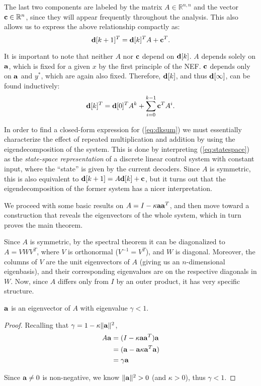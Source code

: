 The last two components are labeled by the matrix $A \in \mathbb{R}^{n,n}$ and the vector $\mathbf{c} \in \mathbb{R}^{n}$, since they will appear frequently throughout the analysis. This also allows us to express the above relationship compactly as:
\begin{equation}
\label{eq:statespace}
\mathbf{d}[k+1]^T = \mathbf{d}[k]^T A + \mathbf{c}^T.
\end{equation}

It is important to note that neither $A$ nor $\mathbf{c}$ depend on $\mathbf{d}[k]$. $A$ depends solely on $\mathbf{a}$, which is fixed for a given $x$ by the first principle of the NEF. $\mathbf{c}$ depends only on $\mathbf{a}$ and $y^*$, which are again also fixed. Therefore, $\mathbf{d}[k]$, and thus $\mathbf{d}[\infty]$, can be found inductively:
\begin{equation}
\label{eq:dksum}
\mathbf{d}[k]^T = \mathbf{d}[0]^T A^k + \sum_{i=0}^{k-1} \mathbf{c}^T A^i.
\end{equation}

In order to find a closed-form expression for (\ref{eq:dksum}) we must essentially characterize the effect of repeated multiplication and addition by using the eigendecomposition of the system. This is done by interpreting (\ref{eq:statespace}) as the {\it state-space representation} of a discrete linear control system with constant input, where the ``state'' is given by the current decoders. Since $A$ is symmetric, this is also equivalent to $\mathbf{d}[k+1] = A \mathbf{d}[k] + \mathbf{c}$, but it turns out that the eigendecomposition of the former system has a nicer interpretation.

We proceed with some basic results on $A = I - \kappa \mathbf{a}\mathbf{a}^T$, and then move toward a construction that reveals the eigenvectors of the whole system, which in turn proves the main theorem.

Since $A$ is symmetric, by the spectral theorem it can be diagonalized to $A = VWV^T$, where $V$ is orthonormal ($V^{-1} = V^T$), and $W$ is diagonal. Moreover, the columns of $V$ are the unit eigenvectors of $A$ (giving us an $n$-dimensional eigenbasis), and their corresponding eigenvalues are on the respective diagonals in $W$. Now, since $A$ differs only from $I$ by an outer product, it has very specific structure.

\begin{lemma}\label{lemma:1} $\mathbf{a}$ is an eigenvector of $A$ with eigenvalue $\gamma < 1$.\end{lemma}

\begin{proof} Recalling that $\gamma = 1 - \kappa \|\mathbf{a}\|^2$,
\begin{align*}
A\mathbf{a} &= (I - \kappa \mathbf{a}\mathbf{a}^T)\mathbf{a} \\
   &= (\mathbf{a} - \mathbf{a} \kappa \mathbf{a}^T\mathbf{a}) \\
   &= \gamma \mathbf{a}
\end{align*}

Since $\mathbf{a} \ne 0$ is non-negative, we know $\|\mathbf{a}\|^2 > 0$ (and $\kappa > 0$), thus $\gamma < 1$.
\end{proof}

